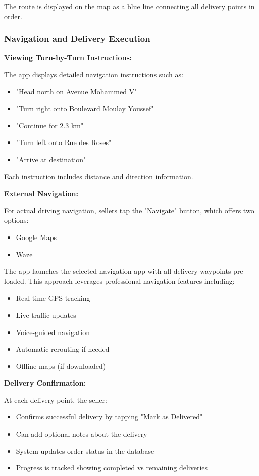 \documentclass[12pt,a4paper]{article}
\begin{document}
The route is displayed on the map as a blue line connecting all delivery points in order.

\subsubsection{Navigation and Delivery Execution}

\textbf{Viewing Turn-by-Turn Instructions:}

The app displays detailed navigation instructions such as:
\begin{itemize}
    \item "Head north on Avenue Mohammed V"
    \item "Turn right onto Boulevard Moulay Youssef"
    \item "Continue for 2.3 km"
    \item "Turn left onto Rue des Roses"
    \item "Arrive at destination"
\end{itemize}

Each instruction includes distance and direction information.

\textbf{External Navigation:}

For actual driving navigation, sellers tap the "Navigate" button, which offers two options:
\begin{itemize}
    \item Google Maps
    \item Waze
\end{itemize}

The app launches the selected navigation app with all delivery waypoints pre-loaded. This approach leverages professional navigation features including:
\begin{itemize}
    \item Real-time GPS tracking
    \item Live traffic updates
    \item Voice-guided navigation
    \item Automatic rerouting if needed
    \item Offline maps (if downloaded)
\end{itemize}

\textbf{Delivery Confirmation:}

At each delivery point, the seller:
\begin{itemize}
    \item Confirms successful delivery by tapping "Mark as Delivered"
    \item Can add optional notes about the delivery
    \item System updates order status in the database
    \item Progress is tracked showing completed vs remaining deliveries
\end{itemize}
\end{document}
